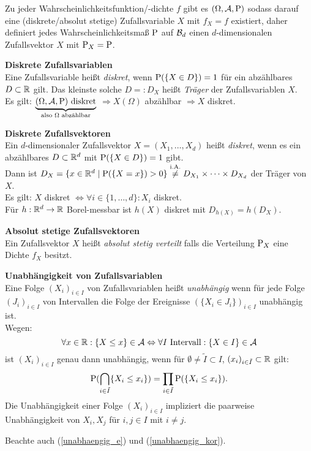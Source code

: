 Zu jeder Wahrscheinlichkeitsfunktion/-dichte $f$ gibt es $(\Omega,\A,\P)$ sodass
darauf eine (diskrete/absolut stetige) Zufallsvariable $X$ mit $f_X=f$ existiert,
daher definiert jedes Wahrscheinlichkeitsmaß $\P$ auf $\B{d}$ einen
$d$-dimensionalen Zufallsvektor $X$ mit $\P_X=\P$.

\textbf{Diskrete Zufallsvariablen}\\
Eine Zufallsvariable heißt \textit{diskret}, wenn $\P(\{X\in D\})=1$
für ein abzählbares $D\subset\R$ gilt.
Das kleinste solche $D=:D_X$ heißt \textit{Träger} der Zufallsvariablen $X$.\\
Es gilt: 
$\underbrace{(\Omega,\A,\P) \text{ diskret}}_{\text{also $\Omega$ abzählbar}}$
$\Rightarrow X(\Omega)$ abzählbar $\Rightarrow X$ diskret.

\textbf{Diskrete Zufallsvektoren}\\
Ein $d$-dimensionaler Zufallsvektor $X=(X_1,\ldots,X_d)$ heißt \textit{diskret},
wenn es ein abzählbares $D\subset\R^d$ mit $\P(\{X\in D\})=1$ gibt.\\
Dann ist $D_X=\{x\in\R^d\mid \P(\{X=x\})>0\}\overset{\text{i.A.}}{\neq} 
D_{X_1}\times\cdots\times D_{X_d}$
der Träger von $X$.\\
Es gilt: $X$ diskret $\Leftrightarrow\forall i\in\{1,\ldots,d\}: X_i$ diskret.\\
Für $h:\R^d\to\R$ Borel-messbar ist $h(X)$ diskret mit $D_{h(X)}=h(D_X)$.

\textbf{Absolut stetige Zufallsvektoren}\\
Ein Zufallsvektor $X$ heißt \textit{absolut stetig verteilt} falls die Verteilung
$\P_X$ eine Dichte $f_X$ besitzt.

\textbf{Unabhängigkeit von Zufallsvariablen}\\
Eine Folge $(X_i)_{i\in I}$ von Zufallsvariablen heißt \textit{unabhängig} wenn für
jede Folge $(J_i)_{i\in I}$ von Intervallen die Folge der Ereignisse
$(\{X_i\in J_i\})_{i\in I}$ unabhängig ist.\\
Wegen:
\[
	\forall x\in\R:\{X\leq x\}\in\A
	\Leftrightarrow\forall I \text{ Intervall}:\{X\in I\}\in\A
\]
ist $(X_i)_{i\in I}$ genau dann unabhängig, wenn für 
$\emptyset\neq\tilde{I}\subset I$, $(x_i)_{i\in\tilde{I}}\subset\R$ gilt:
\[
	\P(\bigcap_{i\in\tilde{I}}\{X_i\leq x_i\})=
	\prod_{i\in\tilde{I}}\P(\{X_i\leq x_i\}).
\]
Die Unabhängigkeit einer Folge $(X_i)_{i\in I}$ impliziert die paarweise
Unabhängigkeit von $X_i,X_j$ für $i,j\in I$ mit $i\neq j$.

Beachte auch (\ref{unabhaengig_e}) und (\ref{unabhaengig_kor}).

